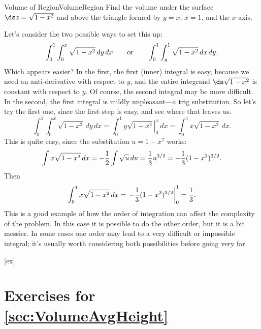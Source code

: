 \begin{example}{Volume of Region}{VolumeRegion}
Find the volume under the surface $\ds z=\sqrt{1-x^2}$ and above
the triangle formed by $y=x$, $x=1$, and the $x$-axis.
\end{example}
\begin{solution}
Let's consider the two possible ways to set this up:
$$\int_0^1 \int_0^x \sqrt{1-x^2}\,dy\,dx \qquad\hbox{or}\qquad
\int_0^1 \int_y^1 \sqrt{1-x^2}\,dx\,dy.
$$
Which appears easier? In the first, the first (inner) integral is
easy, because we need an anti-derivative with respect to $y$, and the
entire integrand $\ds\sqrt{1-x^2}$ is constant with respect to $y$. Of
course, the second integral may be more difficult. In the second, the
first integral is mildly unpleasant---a trig substitution. So let's
try the first one, since the first step is easy, and see where that
leaves us.
\[\int_0^1 \int_0^x \sqrt{1-x^2}\,dy\,dx=
\int_0^1 \left. y\sqrt{1-x^2}\right|_0^x\,dx=
\int_0^1 x\sqrt{1-x^2}\,dx.\]
This is quite easy, since the substitution $u=1-x^2$ works:
\[\int x\sqrt{1-x^2}\,dx=-{1\over 2}\int \sqrt u\,du
={1\over3}u^{3/2}=-{1\over3}(1-x^2)^{3/2}.\]
Then 
\[\int_0^1 x\sqrt{1-x^2}\,dx=\left. -{1\over3}(1-x^2)^{3/2}\right|_0^1
={1\over3}.\]
This is a good example of how the order of integration can affect the
complexity of the problem. In this case it is possible to do the other
order, but it is a bit messier. In some cases one order may lead to a
very difficult or impossible integral; it's usually worth considering
both possibilities before going very far.
\end{solution}


[ex]
\section*{Exercises for \ref{sec:VolumeAvgHeight}}

